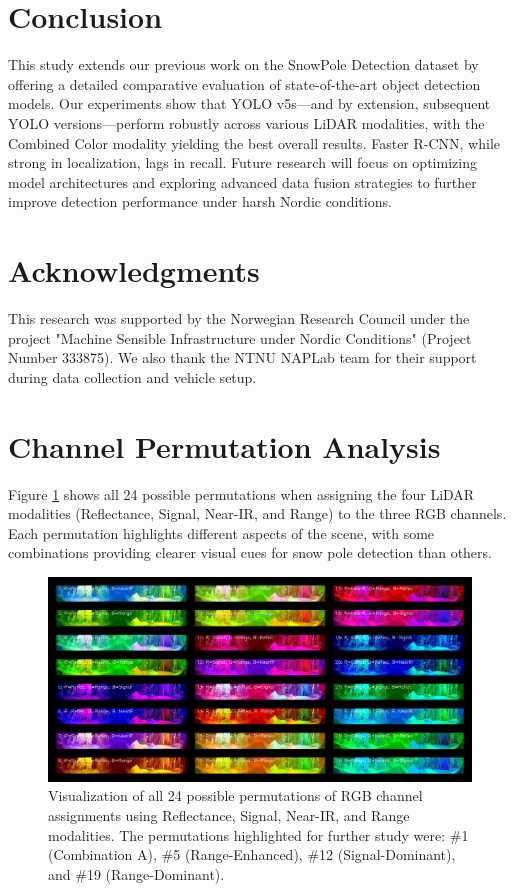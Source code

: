 \documentclass[11pt]{article}
\begin{document}
\section{Conclusion}
This study extends our previous work on the SnowPole Detection dataset by offering a detailed comparative evaluation of state-of-the-art object detection models. Our experiments show that YOLO v5s—and by extension, subsequent YOLO versions—perform robustly across various LiDAR modalities, with the Combined Color modality yielding the best overall results. Faster R-CNN, while strong in localization, lags in recall. Future research will focus on optimizing model architectures and exploring advanced data fusion strategies to further improve detection performance under harsh Nordic conditions.

\section*{Acknowledgments}
This research was supported by the Norwegian Research Council under the project "Machine Sensible Infrastructure under Nordic Conditions" (Project Number 333875). We also thank the NTNU NAPLab team for their support during data collection and vehicle setup.



\appendix
\section{Channel Permutation Analysis}
\label{appendix:channel_permutations}

Figure \ref{fig:all_permutations} shows all 24 possible permutations when assigning the four LiDAR modalities (Reflectance, Signal, Near-IR, and Range) to the three RGB channels. Each permutation highlights different aspects of the scene, with some combinations providing clearer visual cues for snow pole detection than others.

\begin{figure}[htbp]
    \centering
    \includegraphics[width=\textwidth]{permutation_results/all_permutations_overview.png}
    \caption{Visualization of all 24 possible permutations of RGB channel assignments using Reflectance, Signal, Near-IR, and Range modalities. The permutations highlighted for further study were: \#1 (Combination A), \#5 (Range-Enhanced), \#12 (Signal-Dominant), and \#19 (Range-Dominant).}
    \label{fig:all_permutations}
\end{figure}
\end{document}
